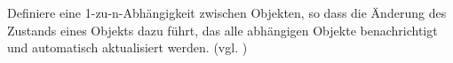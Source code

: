 \glqq Definiere eine 1-zu-n-Abhängigkeit zwischen Objekten, so dass die Änderung des Zustands eines Objekts dazu führt, das alle abhängigen Objekte benachrichtigt und automatisch aktualisiert werden. \grqq (vgl. \cite{GOF95})